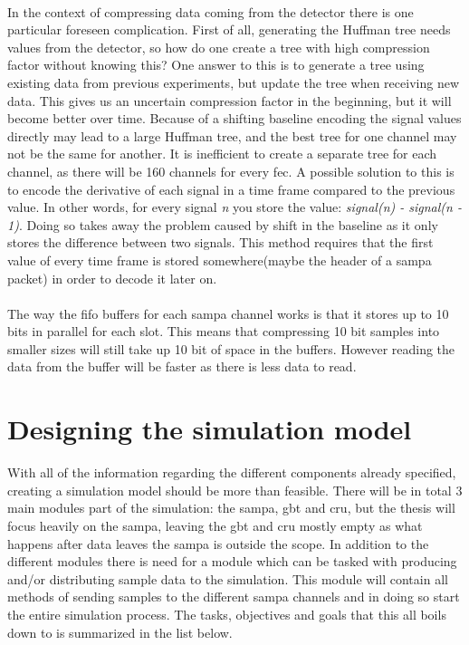 \documentclass[a4paper, 12pt]{report}
\begin{document}
\paragraph{}
In the context of compressing data coming from the detector there is one particular foreseen complication.
First of all, generating the Huffman tree needs values from the detector, so how do one create a tree with high compression factor without knowing this?
One answer to this is to generate a tree using existing data from previous experiments, but update the tree when receiving new data.
This gives us an uncertain compression factor in the beginning, but it will become better over time.
Because of a shifting baseline encoding the signal values directly may lead to a large Huffman tree, and the best tree for one channel may not be the same for another.
It is inefficient to create a separate tree for each channel, as there will be 160 channels for every \gls{fec}.
A possible solution to this is to encode the derivative of each signal in a time frame compared to the previous value.
In other words, for every signal \textit{n} you store the value: \textit{signal(n) - signal(n - 1)}.
Doing so takes away the problem caused by shift in the baseline as it only stores the difference between two signals.
This method requires that the first value of every time frame is stored somewhere(maybe the header of a \gls{sampa} packet) in order to decode it later on.


\paragraph{}
The way the \gls{fifo} buffers for each \gls{sampa} channel works is that it stores up to 10 bits in parallel for each slot.
This means that compressing 10 bit samples into smaller sizes will still take up 10 bit of space in the buffers. 
However reading the data from the buffer will be faster as there is less data to read.

\section{Designing the simulation model}
With all of the information regarding the different components already specified, creating a simulation model should be more than feasible.
There will be in total 3 main modules part of the simulation: the \gls{sampa}, \gls{gbt} and \gls{cru}, but the thesis will focus heavily on the \gls{sampa}, leaving the \gls{gbt} and \gls{cru} mostly empty as what happens after data leaves the \gls{sampa} is outside the scope.
In addition to the different modules there is need for a module which can be tasked with producing and/or distributing sample data to the simulation.
This module will contain all methods of sending samples to the different \gls{sampa} channels and in doing so start the entire simulation process.
The tasks, objectives and goals that this all boils down to is summarized in the list below.
\end{document}
